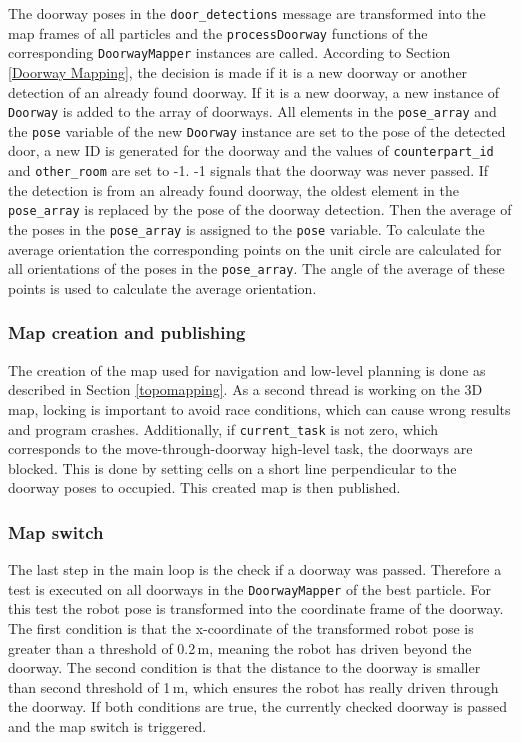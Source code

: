The doorway poses in the \texttt{door{\_}detections} message are transformed into the map frames of all particles and the \texttt{processDoorway} functions of the corresponding \texttt{DoorwayMapper} instances are called. According to Section \ref{Doorway Mapping}, the decision is made if it is a new doorway or another detection of an already found doorway. If it is a new doorway, a new instance of \texttt{Doorway} is added to the array of doorways. All elements in the \texttt{pose{\_}array} and the \texttt{pose} variable of the new \texttt{Doorway} instance are set to the pose of the detected door, a new ID is generated for the doorway and the values of \texttt{counterpart{\_}id} and \texttt{other{\_}room} are set to -1. -1 signals that the doorway was never passed. If the detection is from an already found doorway, the oldest element in the \texttt{pose{\_}array} is replaced by the pose of the doorway detection. Then the average of the poses in the \texttt{pose{\_}array} is assigned to the \texttt{pose} variable. To calculate the average orientation the corresponding points on the unit circle are calculated for all orientations of the poses in the \texttt{pose{\_}array}. The angle of the average of these points is used to calculate the average orientation.

\subsubsection{Map creation and publishing}

The creation of the map used for navigation and low-level planning is done as described in Section \ref{topomapping}. As a second thread is working on the 3D map, locking is important to avoid race conditions, which can cause wrong results and program crashes. Additionally, if \texttt{current{\_}task} is not zero, which corresponds to the move-through-doorway high-level task, the doorways are blocked. This is done by setting cells on a short line perpendicular to the doorway poses to occupied. This created map is then published. 

\subsubsection{Map switch}

The last step in the main loop is the check if a doorway was passed. Therefore a test is executed on all doorways in the \texttt{DoorwayMapper} of the best particle. For this test the robot pose is transformed into the coordinate frame of the doorway. The first condition is that the x-coordinate of the transformed robot pose is greater than a threshold of 0.2\,m, meaning the robot has driven beyond the doorway. The second condition is that the distance to the doorway is smaller than second threshold of 1\,m, which ensures the robot has really driven through the doorway. If both conditions are true, the currently checked doorway is passed and the map switch is triggered.

